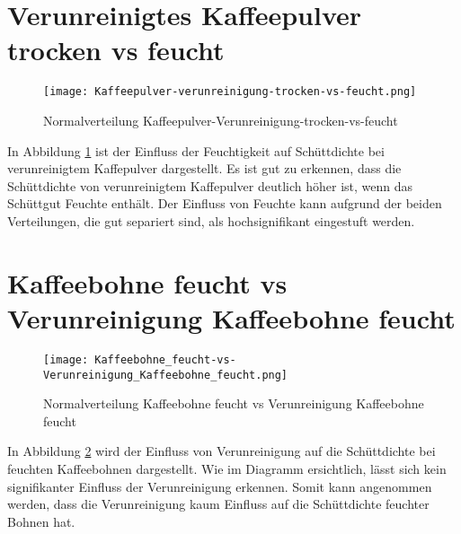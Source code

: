 \section{Verunreinigtes Kaffeepulver trocken vs feucht}
    \begin{figure}[H]
        \centering
        \texttt{[image: Kaffeepulver-verunreinigung-trocken-vs-feucht.png]}
        \caption{Normalverteilung Kaffeepulver-Verunreinigung-trocken-vs-feucht}
        \label{fig: Norm.Kaffeepulver-verunreinigung-trocken-vs-feucht}
    \end{figure}

    In Abbildung \ref{fig: Norm.Kaffeepulver-verunreinigung-trocken-vs-feucht} ist der
    Einfluss der Feuchtigkeit auf Schüttdichte bei verunreinigtem Kaffepulver dargestellt. Es
    ist gut zu erkennen, dass die Schüttdichte von verunreinigtem Kaffepulver deutlich höher
    ist, wenn das Schüttgut Feuchte enthält. Der Einfluss von Feuchte kann aufgrund der
    beiden Verteilungen, die gut separiert sind, als hochsignifikant eingestuft werden.

\section{Kaffeebohne feucht vs Verunreinigung Kaffeebohne feucht}
    \begin{figure}[H]
        \centering
        \texttt{[image: Kaffeebohne\_feucht-vs-Verunreinigung\_Kaffeebohne\_feucht.png]}
        \caption{Normalverteilung Kaffeebohne feucht vs Verunreinigung Kaffeebohne feucht}
        \label{fig: Norm.Kaffeebohne_feucht-vs-Verunreinigung_Kaffeebohne_feucht}
    \end{figure}

    In Abbildung \ref{fig: Norm.Kaffeebohne_feucht-vs-Verunreinigung_Kaffeebohne_feucht} wird
    der Einfluss von Verunreinigung auf die Schüttdichte bei feuchten Kaffeebohnen dargestellt.
    Wie im Diagramm ersichtlich, lässt sich kein signifikanter Einfluss der Verunreinigung
    erkennen. Somit kann angenommen werden, dass die Verunreinigung kaum Einfluss auf die
    Schüttdichte feuchter Bohnen hat.

